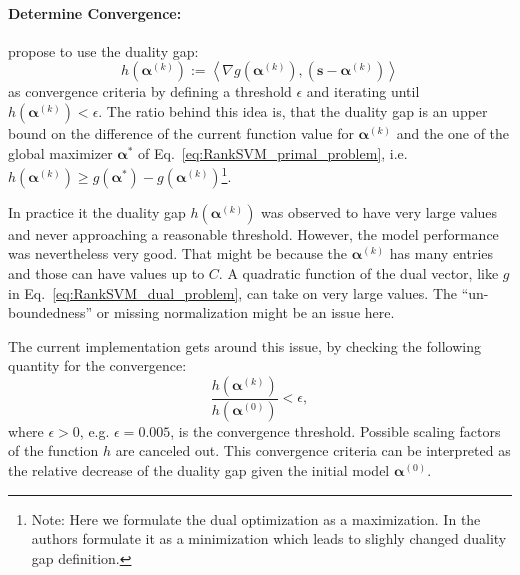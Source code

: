 \documentclass{article}
\newcommand{\defi}{:=}
\newcommand{\balpha}{\boldsymbol{\alpha}}
\begin{document}
\paragraph{Determine Convergence:}
\textcite{Jaggi2013} propose to use the duality gap:
\begin{equation}
    h\left(\balpha^{(k)}\right)\defi\left\langle\nabla g\left(\balpha^{(k)}\right),\left(\mathbf{s}-\balpha^{(k)}\right)\right\rangle
\end{equation}
as convergence criteria by defining a threshold $\epsilon$ and iterating until $h(\balpha^{(k)})<\epsilon$. The ratio behind this idea is, that the duality gap is an upper bound on the difference of the current function value for $\balpha^{(k)}$ and the one of the global maximizer $\balpha^*$ of Eq.~\eqref{eq:RankSVM_primal_problem}, i.e. $h\left(\balpha^{(k)}\right)\geq g\left(\balpha^*\right)-g\left(\balpha^{(k)}\right)$\footnote{Note: Here we formulate the dual optimization as a maximization. In \cite{Jaggi2013} the authors formulate it as a minimization which leads to slighly changed duality gap definition.}. 
\begin{mdframed}[style=openquestion]
    In practice it the duality gap $h\left(\balpha^{(k)}\right)$ was observed to have very large values and never approaching a reasonable threshold. However, the model performance was nevertheless very good. That might be because the $\balpha^{(k)}$ has many entries and those can have values up to $C$. A quadratic function of the dual vector, like $g$ in Eq.~\eqref{eq:RankSVM_dual_problem}, can take on very large values. The ``un-boundedness'' or missing normalization might be an issue here.  
    
    The current implementation gets around this issue, by checking the following quantity for the convergence:
\begin{equation}
    \frac{h(\balpha^{(k)})}{h(\balpha^{(0)})}<\epsilon,
\end{equation}
    where $\epsilon>0$, e.g. $\epsilon=0.005$, is the convergence threshold. Possible scaling factors of the function $h$ are canceled out. This convergence criteria can be interpreted as the relative decrease of the duality gap given the initial model $\balpha^{(0)}$. 
\end{mdframed}
\end{document}
